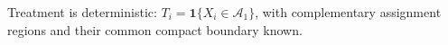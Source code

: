 Treatment is deterministic: \(T_i=\mathbf 1\{X_i\in\mathcal A_1\}\), with complementary assignment regions and their common compact boundary known.
